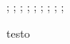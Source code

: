 \linespread{1.5} %

\tiny; \scriptisze; \footnotesize;
\small;	\normalsize; \large; \Large; 
\LARGE; \huge; \Huge

\small{testo}

